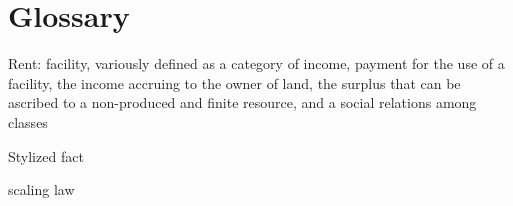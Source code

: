 \chapter{Glossary}

Rent: facility,  variously defined as a category of income, payment for the use of a facility,  the income accruing to the owner of land,  the surplus that can be ascribed to a non-produced and finite resource, and a social relations among classes

Stylized fact


 
scaling law

